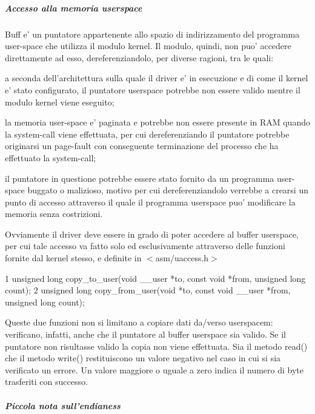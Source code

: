 \subparagraph*{Accesso alla memoria userspace}

Buff e' un puntatore appartenente allo spazio di indirizzamento del programma user-\/space che utilizza il modulo kernel. Il modulo, quindi, non puo' accedere direttamente ad esso, dereferenziandolo, per diverse ragioni, tra le quali\+:
\begin{DoxyItemize}
\item a seconda dell'architettura sulla quale il driver e' in esecuzione e di come il kernel e' stato configurato, il puntatore userspace potrebbe non essere valido mentre il modulo kernel viene eseguito;
\item la memoria user-\/space e' paginata e potrebbe non essere presente in R\+A\+M quando la system-\/call viene effettuata, per cui dereferenziando il puntatore potrebbe originarsi un page-\/fault con conseguente terminazione del processo che ha effettuato la system-\/call;
\item il puntatore in questione potrebbe essere stato fornito da un programma user-\/space buggato o malizioso, motivo per cui dereferenziandolo verrebbe a crearsi un punto di accesso attraverso il quale il programma userspace puo' modificare la memoria senza costrizioni.
\end{DoxyItemize}

Ovviamente il driver deve essere in grado di poter accedere al buffer userspace, per cui tale accesso va fatto solo ed esclusivamente attraverso delle funzioni fornite dal kernel stesso, e definite in $<$asm/uaccess.\+h$>$ 
\begin{DoxyCode}
1 unsigned long copy\_to\_user(void \_\_user *to, const void *from, unsigned long count);
2 unsigned long copy\_from\_user(void *to, const void \_\_user *from, unsigned long count);
\end{DoxyCode}
 Queste due funzioni non si limitano a copiare dati da/verso userspacem\+: verificano, infatti, anche che il puntatore al buffer userspace sia valido. Se il puntatore non risultasse valido la copia non viene effettuata. Sia il metodo read() che il metodo write() restituiscono un valore negativo nel caso in cui si sia verificato un errore. Un valore maggiore o uguale a zero indica il numero di byte trasferiti con successo.

\subparagraph*{Piccola nota sull'endianess}

